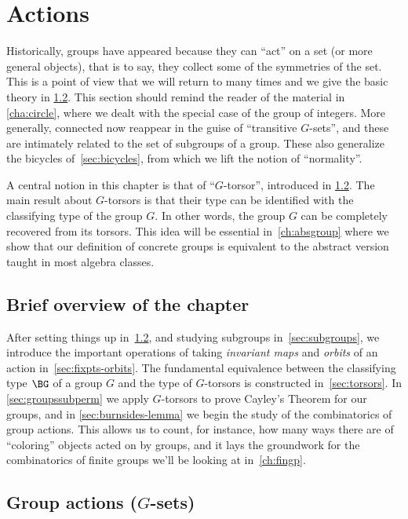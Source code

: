 
\chapter{Actions}
\label{ch:actions}

Historically, groups have appeared because they can ``act'' on a set
(or more general objects), that is to say, they collect some of the
symmetries of the set. This is a point of view that we will return to
many times and we give the basic theory in \cref{sec:gsets}.
This section should remind the reader of the material in \cref{cha:circle},
where we dealt with the special case of the group of integers.
More generally, connected \coverings now reappear in the guise of
``transitive $G$-sets'', and these are intimately related to
the set of subgroups of a group.
These also generalize the bicycles of~\cref{sec:bicycles},
from which we lift the notion of ``normality''.

A central notion in this chapter is that of ``$G$-torsor'', introduced in
\cref{sec:gsets}. The main result about $G$-torsors is that their type can be
identified with the classifying type of the group $G$. In other words, the
group $G$ can be completely recovered from its torsors. This idea will be
essential in~\cref{ch:absgroup} where we show that our definition of concrete
groups is equivalent to the abstract version taught in most algebra classes.


\section{Brief overview of the chapter}

After setting things up in~\cref{sec:gsets}, and
studying subgroups in~\cref{sec:subgroups},
we introduce the important
operations of taking \emph{invariant maps} and \emph{orbits} of an action
in~\cref{sec:fixpts-orbits}.
The fundamental equivalence between the classifying type $\BG$ of a group $G$
and the type of $G$-torsors is constructed in~\cref{sec:torsors}. 
In \cref{sec:groupssubperm} we apply $G$-torsors to prove Cayley's Theorem
for our groups, and in \cref{sec:burnsides-lemma} we
begin the study of the combinatorics of group actions.
This allows us to count, for instance, how many ways there are of 
``coloring'' objects acted on by groups,
and it lays the groundwork for the combinatorics of finite groups
we'll be looking at in~\cref{ch:fingp}.

\section{Group actions ($G$-sets)}
\label{sec:gsets}


